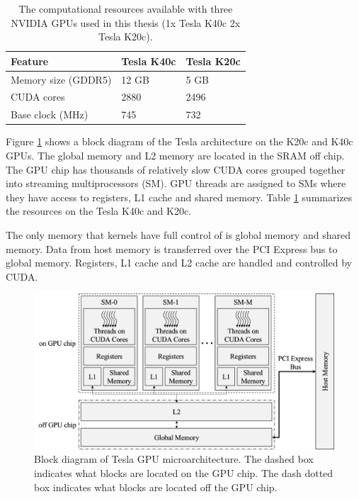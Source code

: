 \begin{table}
\begin{center}
\begin{tabular}{lll}
	\toprule
	Feature 			& Tesla K40c 	& Tesla K20c 	\\ \midrule
	Memory size (GDDR5) & 12 GB 		& 5 GB 			\\
	CUDA cores 			& 2880 			& 2496 			\\
	Base clock (MHz) 	& 745 			& 732 			\\ \bottomrule
\end{tabular}
\end{center}
\caption{The computational resources available with three NVIDIA GPUs used in this thesis (1x Tesla K40c 2x Tesla K20c).}
\label{tab:gpu-resources_jeffs}
\end{table}


Figure \ref{fig:GPU_blockDiagram} shows a block diagram of the Tesla architecture on the K20c and K40c GPUs.
The global memory and L2 memory are located in the SRAM off chip.
The GPU chip has thousands of relatively slow CUDA cores grouped together into streaming multiprocessors (SM).
GPU threads are assigned to SMs where they have access to registers, L1 cache and shared memory.
Table \ref{tab:gpu-resources_jeffs} summarizes the resources on the Tesla K40c and K20c.

The only memory that kernels have full control of is global memory and shared memory.
Data from host memory is transferred over the PCI Express bus to global memory.
Registers, L1 cache and L2 cache are handled and controlled by CUDA.
\begin{figure}
	\centering\includegraphics[width=5in]{figures/gpu_intro/GPU_blockDiagram.png}
	\caption{Block diagram of Tesla GPU microarchitecture. The dashed box indicates what blocks are located on the GPU chip. The dash dotted box indicates what blocks are located off the GPU chip.}
	\label{fig:GPU_blockDiagram}
\end{figure}

